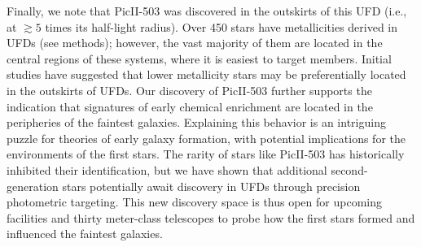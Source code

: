 \documentclass[pdflatex,sn-nature]{sn-jnl}%
\theoremstyle{thmstyleone}%
\theoremstyle{thmstyletwo}%
\theoremstyle{thmstylethree}%
\begin{document}
Finally, we note that PicII-503 was discovered in the outskirts of this UFD (i.e., at $\gtrsim5$ times its half-light radius).
Over 450 stars have metallicities derived in UFDs (see methods); however, the vast majority of them are located in the central regions of these systems, where it is easiest to target members. 
Initial studies have suggested that lower metallicity stars may be preferentially located in the outskirts of UFDs\cite{cfs+21,lja+22}.
Our discovery of PicII-503 further supports the indication that signatures of early chemical enrichment are located in the peripheries of the faintest galaxies. 
Explaining this behavior is an intriguing puzzle for theories of early galaxy formation, with potential implications for the environments of the first stars\cite{bem+25}. 
The rarity of stars like PicII-503 has historically inhibited their identification, but we have shown that additional second-generation stars potentially await discovery in UFDs through precision photometric targeting. 
This new discovery space is thus open for upcoming facilities and thirty meter-class telescopes to probe how the first stars formed and influenced the faintest galaxies.
\end{document}

